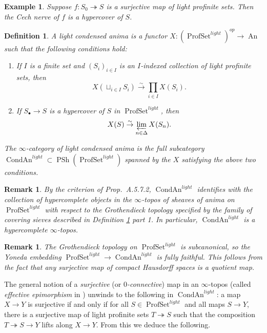 \documentclass[12pt]{article}
\newtheorem{definition}[theorem]{Definition}
\newtheorem{example}[theorem]{Example}
\newtheorem{remark}[theorem]{Remark}
\newcommand{\on}{\operatorname}
\begin{document}
\begin{example}
Suppose $f:S_0\twoheadrightarrow S$ is a surjective map of light profinite sets.  Then the Cech nerve of $f$ is a hypercover of $S$.
\end{example}

\begin{definition}\label{lightdef}
A \emph{light condensed anima} is a functor $X:(\on{ProfSet}^{light})^{op}\rightarrow\on{An}$ such that the following conditions hold:
\begin{enumerate}
\item If $I$ is a finite set and $(S_i)_{i\in I}$ is an $I$-indexed collection of light profinite sets, then
$$X(\sqcup_{i\in I} S_i)\overset{\sim}{\rightarrow}\prod_{i\in I}X(S_i).$$
\item If $S_\bullet \rightarrow S$ is a hypercover of $S$ in $\on{ProfSet}^{light}$, then
$$X(S)\overset{\sim}{\rightarrow}\varprojlim_{n\in\Delta} X(S_n).$$
\end{enumerate}
The $\infty$-category of light condensed anima is the full subcategory $\on{CondAn}^{light}\subset\on{PSh}(\on{ProfSet}^{light})$ spanned by the $X$ satisfying the above two conditions.
\end{definition}

\begin{remark}
By the criterion of \cite{LurieSAG} Prop.\ A.5.7.2, $\on{CondAn}^{light}$ identifies with the collection of hypercomplete objects in the $\infty$-topos of sheaves of anima on $\on{ProfSet}^{light}$ with respect to the Grothendieck topology specified by the family of covering sieves described in Definition \ref{lightdef} part 1.  In particular, $\on{CondAn}^{light}$ is a hypercomplete $\infty$-topos.
\end{remark}

\begin{remark}
The Grothendieck topology on $\on{ProfSet}^{light}$ is subcanonical, so the Yoneda embedding $\on{ProfSet}^{light}\rightarrow \on{CondAn}^{light}$ is fully faithful.  This follows from the fact that any surjective map of compact Hausdorff spaces is a quotient map.
\end{remark}

The general notion of a \emph{surjective} (or \emph{$0$-connective}) map in an $\infty$-topos (called \emph{effective epimorphism} in \cite{LurieHTT}) unwinds to the following in $\on{CondAn}^{light}$: a map $X\rightarrow Y$ is surjective if and only if for all $S\in\on{ProfSet}^{light}$ and all maps $S\rightarrow Y$, there is a surjective map of light profinite sets $T\twoheadrightarrow S$ such that the composition $T\twoheadrightarrow S\rightarrow Y$ lifts along $X\rightarrow Y$.  From this we deduce the following.
\end{document}
